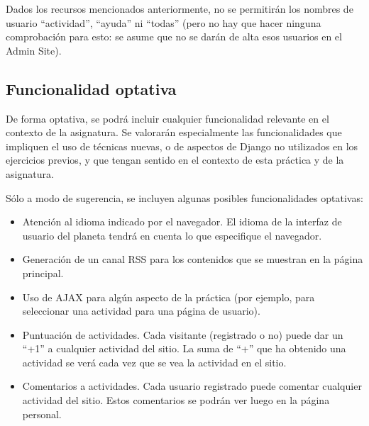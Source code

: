 
Dados los recursos mencionados anteriormente, no se permitirán los nombres de usuario ``actividad'', ``ayuda'' ni ``todas'' (pero no hay que hacer ninguna comprobación para esto: se asume que no se darán de alta esos usuarios en el Admin Site).



\subsection{Funcionalidad optativa}

De forma optativa, se podrá incluir cualquier funcionalidad relevante en el contexto de la asignatura. Se valorarán especialmente las funcionalidades que impliquen el uso de técnicas nuevas, o de aspectos de Django no utilizados en los ejercicios previos, y que tengan sentido en el contexto de esta práctica y de la asignatura.

Sólo a modo de sugerencia, se incluyen algunas posibles funcionalidades optativas:

\begin{itemize}
\item Atención al idioma indicado por el navegador. El idioma de la interfaz de usuario del planeta tendrá en cuenta lo que especifique el navegador.

\item Generación de un canal RSS para los contenidos que se muestran en la página principal.

\item Uso de AJAX para algún aspecto de la práctica (por ejemplo, para seleccionar una actividad para una página de usuario).

\item Puntuación de actividades. Cada visitante (registrado o no) puede dar un ``+1'' a cualquier actividad del sitio. La suma de ``+'' que ha obtenido una actividad se verá cada vez que se vea la actividad en el sitio.

\item Comentarios a actividades. Cada usuario registrado puede comentar cualquier actividad del sitio. Estos comentarios se podrán ver luego en la página personal.

\end{itemize}


